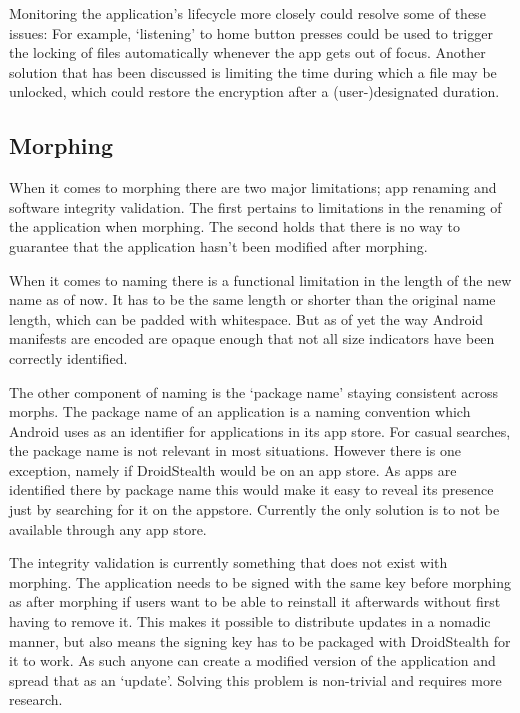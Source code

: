 Monitoring the application's lifecycle more closely could resolve some of these issues:
For example, `listening' to home button presses could be used to trigger the locking of files automatically whenever the app gets out of focus.
Another solution that has been discussed is limiting the time during which a file may be unlocked, which could restore the encryption after a (user-)designated duration.

\subsection{Morphing} 
\label{sec:limitations:morphing}

When it comes to morphing there are two major limitations; app renaming and software integrity validation. 
The first pertains to limitations in the renaming of the application when morphing. 
The second holds that there is no way to guarantee that the application hasn't been modified after morphing.

When it comes to naming there is a functional limitation in the length of the new name as of now.
It has to be the same length or shorter than the original name length, which can be padded with whitespace. 
But as of yet the way Android manifests are encoded are opaque enough that not all size indicators have been correctly identified.

The other component of naming is the `package name' staying consistent across morphs. 
The package name of an application is a naming convention which Android uses as an identifier for applications in its app store.
For casual searches, the package name is not relevant in most situations.
However there is one exception, namely if DroidStealth would be on an app store. 
As apps are identified there by package name this would make it easy to reveal its presence just by searching for it on the appstore.
Currently the only solution is to not be available through any app store.

The integrity validation is currently something that does not exist with morphing. 
The application needs to be signed with the same key before morphing as after morphing if users want to be able to reinstall it afterwards without first having to remove it. 
This makes it possible to distribute updates in a nomadic manner, but also means the signing key has to be packaged with DroidStealth for it to work. 
As such anyone can create a modified version of the application and spread that as an `update'.
Solving this problem is non-trivial and requires more research.

